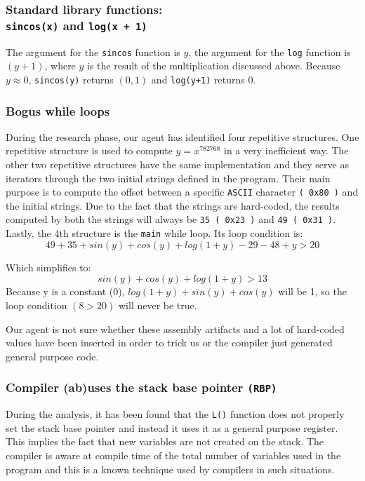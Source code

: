 \subsubsection{Standard library functions: \\ \texttt{sincos(x)} and \texttt{log(x + 1)}}
The argument for the \texttt{sincos} function is $y$, the argument for the \texttt{log} function is $(y + 1)$, where $y$ is the result of the multiplication discussed above. Because $y \approx 0$, \texttt{sincos(y)} returns $(0,1)$ and \texttt{log(y+1)} returns $0$.
\subsubsection{Bogus while loops}
During the research phase, our agent has identified four repetitive structures. One repetitive structure is used to compute $y = x^{782768}$ in a very inefficient way. The other two repetitive structures have the same implementation and they serve as iterators through the two initial strings defined in the program. Their main purpose is to compute the offset between a specific \texttt{ASCII} character \texttt{( 0x80 )} and the initial strings. Due to the fact that the strings are hard-coded, the results computed by both the strings will always be \texttt{35 ( 0x23 )} and \texttt{49 ( 0x31 )}.
Lastly, the 4th structure is the \texttt{main} while loop. Its loop condition is:
$$49 + 35 + sin(y) + cos(y) + log(1+y) - 29 - 48 + y > 20$$

Which simplifies to:
$$sin(y) + cos(y) + log(1+y) > 13$$
Because y is a constant (0), $log(1+y) + sin(y) + cos(y)$ will be 1, so the loop condition $(8 > 20)$ will never be true.

Our agent is not sure whether these assembly artifacts and a lot of hard-coded values have been inserted in order to trick us or the compiler just generated general purpose code.

\subsubsection{Compiler (ab)uses the stack base pointer \texttt{(RBP)}}
During the analysis, it has been found that the \texttt{L()} function does not properly set the stack base pointer and instead it uses it as a general purpose register. This implies the fact that new variables are not created on the stack. The compiler is aware at compile time of the total number of variables used in the program and this is a known technique used by compilers in such situations.

